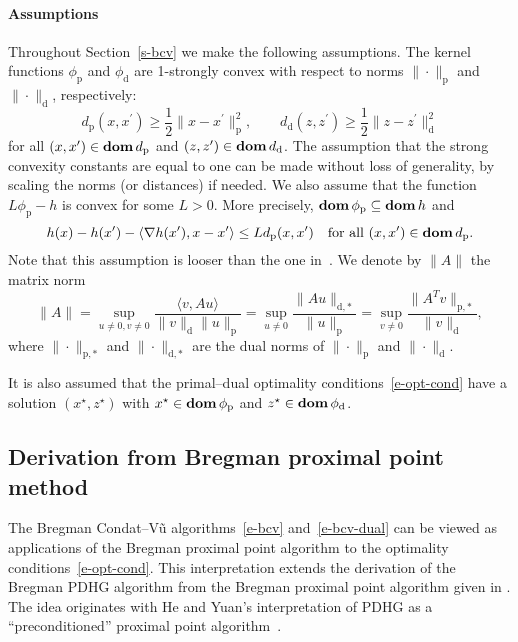\documentclass[letterpaper,11pt]{article}
\newcommand{\BEQ}{\begin{equation}}
\newcommand{\EEQ}{\end{equation}}
\newcommand{\dom}{\mathop{\bf dom}}
\newcommand{\inprod}[2]{\langle#1, #2\rangle}
\newcommand{\primal}{\mathrm p}
\newcommand{\dual}{\mathrm d}
\begin{document}
\paragraph{Assumptions} 
Throughout Section~\ref{s-bcv} we make the following assumptions.
The kernel functions $\phi_\primal$ and $\phi_\dual$ are 
1-strongly convex with respect to norms $\|\cdot\|_\primal$ and 
$\|\cdot\|_\dual$, respectively:
\begin{equation} \label{e-bcv-str-cvx}
d_\primal(x,x^\prime) \geq \frac{1}{2}\|x-x^\prime\|^2_\primal, \qquad
d_\dual(z,z^\prime) \geq \frac{1}{2}\|z-z^\prime\|^2_\dual
\end{equation}
for all $(x,x') \in \dom d_\primal$ and $(z,z') \in \dom d_\dual$.
The assumption that the strong convexity constants are equal to one
can be made without loss of generality, by scaling the norms (or distances)
if needed.
We also assume that the function $L\phi_\primal-h$ is convex for some 
$L>0$.  More precisely, $\dom \phi_\primal \subseteq \dom h$ and
\BEQ \label{e-bcv-lip}
h(x)-h(x^\prime)-\inprod{\nabla h(x^\prime)}{x-x^\prime}
\leq Ld_\primal (x,x^\prime) \quad \mbox{for all\ }
(x,x^\prime) \in \dom d_\primal.
\EEQ
Note that this assumption is looser than
the one in~\cite[Equation~(4)]{ChP:16}.
We denote by $\|A\|$ the matrix norm
\BEQ \label{e-norm}
\|A\|=\sup_{u \neq 0, v \neq 0}
    \frac{\inprod{v}{Au}}{\|v\|_\dual \|u\|_\primal}
 = \sup_{u\neq 0} \frac{\|Au\|_{\dual,*}}{\|u\|_\primal}
 = \sup_{v\neq 0} \frac{\|A^Tv\|_{\primal,*}}{\|v\|_\dual},
\EEQ
where $\|\cdot\|_{\primal,*}$ and $\|\cdot\|_{\dual,*}$ are
the dual norms of $\|\cdot\|_\primal$ and $\|\cdot\|_\dual$. 

It is also assumed that the primal--dual optimality 
conditions~\eqref{e-opt-cond} have a solution $(x^\star, z^\star)$
with $x^\star \in \dom \phi_\primal$ and 
$z^\star \in \dom \phi_\dual$.  

\subsection{Derivation from Bregman proximal point method}
\label{s-bcv-ppm}

The Bregman Condat--V\~u algorithms~\eqref{e-bcv} and~\eqref{e-bcv-dual} 
can be viewed as applications of the Bregman proximal point algorithm
to the optimality conditions~\eqref{e-opt-cond}.
This interpretation extends the derivation of the Bregman PDHG algorithm 
from the Bregman proximal point algorithm given in \cite{JV22}.
The idea originates with He and Yuan's interpretation of PDHG as a 
``preconditioned'' proximal point algorithm~\cite{HeY:12}.
\end{document}
